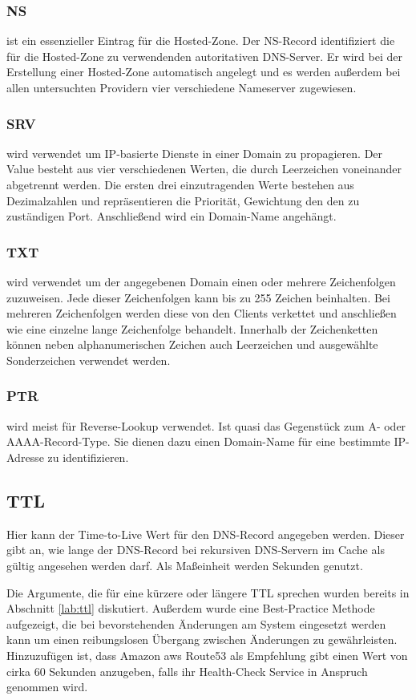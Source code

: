 \subsubsection{NS}
ist ein essenzieller Eintrag für die Hosted-Zone. Der NS-Record identifiziert die für die Hosted-Zone zu verwendenden autoritativen DNS-Server. Er wird bei der Erstellung einer Hosted-Zone automatisch angelegt und es werden außerdem bei allen untersuchten Providern vier verschiedene Nameserver zugewiesen.

\subsubsection{SRV}
wird verwendet um IP-basierte Dienste in einer Domain zu propagieren. Der Value besteht aus vier verschiedenen Werten, die durch Leerzeichen voneinander abgetrennt werden. Die ersten drei einzutragenden Werte bestehen aus Dezimalzahlen und repräsentieren die Priorität, Gewichtung den den zu zuständigen Port. Anschließend wird ein Domain-Name angehängt.

\subsubsection{TXT}
wird verwendet um der angegebenen Domain einen oder mehrere Zeichenfolgen zuzuweisen. Jede dieser Zeichenfolgen kann bis zu 255 Zeichen beinhalten. Bei mehreren Zeichenfolgen werden diese von den Clients verkettet und anschließen wie eine einzelne lange Zeichenfolge behandelt. Innerhalb der Zeichenketten können neben alphanumerischen Zeichen auch Leerzeichen und ausgewählte Sonderzeichen verwendet werden.

\subsubsection{PTR}
wird meist für Reverse-Lookup verwendet. Ist quasi das Gegenstück zum A- oder AAAA-Record-Type. Sie dienen dazu einen Domain-Name für eine bestimmte IP-Adresse zu identifizieren.

\subsection{TTL}
Hier kann der Time-to-Live Wert für den DNS-Record angegeben werden. Dieser gibt an, wie lange der DNS-Record bei rekursiven DNS-Servern im Cache als gültig angesehen werden darf. Als Maßeinheit werden Sekunden genutzt. 

Die Argumente, die für eine kürzere oder längere TTL sprechen wurden bereits in Abschnitt \ref{lab:ttl} diskutiert. Außerdem wurde eine Best-Practice Methode aufgezeigt, die bei bevorstehenden Änderungen am System eingesetzt werden kann um einen reibungslosen Übergang zwischen Änderungen zu gewährleisten. Hinzuzufügen ist, dass Amazon aws Route53 als Empfehlung gibt einen Wert von cirka 60 Sekunden anzugeben, falls ihr Health-Check Service in Anspruch genommen wird.


